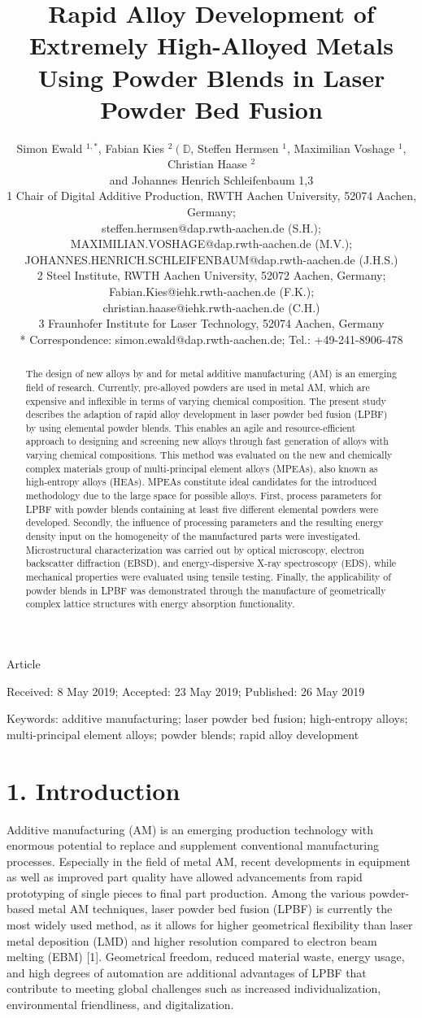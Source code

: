 \documentclass[10pt]{article}
\title{Rapid Alloy Development of Extremely High-Alloyed Metals Using Powder Blends in Laser Powder Bed Fusion }
\author{Simon Ewald ${ }^{1, *}$, Fabian Kies ${ }^{2}\left(\mathbb{D}\right.$, Steffen Hermsen ${ }^{1}$, Maximilian Voshage ${ }^{1}$, Christian Haase ${ }^{2}$\\
and Johannes Henrich Schleifenbaum 1,3\\
1 Chair of Digital Additive Production, RWTH Aachen University, 52074 Aachen, Germany;\\
steffen.hermsen@dap.rwth-aachen.de (S.H.); MAXIMILIAN.VOSHAGE@dap.rwth-aachen.de (M.V.);\\
JOHANNES.HENRICH.SCHLEIFENBAUM@dap.rwth-aachen.de (J.H.S.)\\
2 Steel Institute, RWTH Aachen University, 52072 Aachen, Germany; Fabian.Kies@iehk.rwth-aachen.de (F.K.);\\
christian.haase@iehk.rwth-aachen.de (C.H.)\\
3 Fraunhofer Institute for Laser Technology, 52074 Aachen, Germany\\
* Correspondence: simon.ewald@dap.rwth-aachen.de; Tel.: +49-241-8906-478}
\date{}
\begin{document}
\maketitle
Article

Received: 8 May 2019; Accepted: 23 May 2019; Published: 26 May 2019

\begin{abstract}
The design of new alloys by and for metal additive manufacturing (AM) is an emerging field of research. Currently, pre-alloyed powders are used in metal AM, which are expensive and inflexible in terms of varying chemical composition. The present study describes the adaption of rapid alloy development in laser powder bed fusion (LPBF) by using elemental powder blends. This enables an agile and resource-efficient approach to designing and screening new alloys through fast generation of alloys with varying chemical compositions. This method was evaluated on the new and chemically complex materials group of multi-principal element alloys (MPEAs), also known as high-entropy alloys (HEAs). MPEAs constitute ideal candidates for the introduced methodology due to the large space for possible alloys. First, process parameters for LPBF with powder blends containing at least five different elemental powders were developed. Secondly, the influence of processing parameters and the resulting energy density input on the homogeneity of the manufactured parts were investigated. Microstructural characterization was carried out by optical microscopy, electron backscatter diffraction (EBSD), and energy-dispersive X-ray spectroscopy (EDS), while mechanical properties were evaluated using tensile testing. Finally, the applicability of powder blends in LPBF was demonstrated through the manufacture of geometrically complex lattice structures with energy absorption functionality.
\end{abstract}

Keywords: additive manufacturing; laser powder bed fusion; high-entropy alloys; multi-principal element alloys; powder blends; rapid alloy development

\section*{1. Introduction}
Additive manufacturing (AM) is an emerging production technology with enormous potential to replace and supplement conventional manufacturing processes. Especially in the field of metal $\mathrm{AM}$, recent developments in equipment as well as improved part quality have allowed advancements from rapid prototyping of single pieces to final part production. Among the various powder-based metal AM techniques, laser powder bed fusion (LPBF) is currently the most widely used method, as it allows for higher geometrical flexibility than laser metal deposition (LMD) and higher resolution compared to electron beam melting (EBM) [1]. Geometrical freedom, reduced material waste, energy usage, and high degrees of automation are additional advantages of LPBF that contribute to meeting global challenges such as increased individualization, environmental friendliness, and digitalization.
\end{document}
